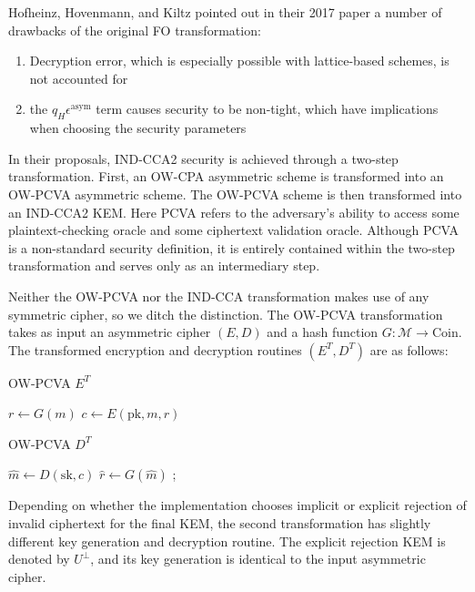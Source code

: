 \documentclass{article}
\begin{document}
Hofheinz, Hovenmann, and Kiltz pointed out in their 2017 paper a number of drawbacks of the original FO transformation:

\begin{enumerate}
    \item Decryption error, which is especially possible with lattice-based schemes, is not accounted for
    \item the $q_H\epsilon^\text{asym}$ term causes security to be non-tight, which have implications when choosing the security parameters
\end{enumerate}

In their proposals, IND-CCA2 security is achieved through a two-step transformation. First, an OW-CPA asymmetric scheme is transformed into an OW-PCVA asymmetric scheme. The OW-PCVA scheme is then transformed into an IND-CCA2 KEM. Here PCVA refers to the adversary's ability to access some plaintext-checking oracle and some ciphertext validation oracle. Although PCVA is a non-standard security definition, it is entirely contained within the two-step transformation and serves only as an intermediary step.

Neither the OW-PCVA nor the IND-CCA transformation makes use of any symmetric cipher, so we ditch the distinction. The OW-PCVA transformation takes as input an asymmetric cipher $(E, D)$ and a hash function $G: \mathcal{M} \rightarrow \text{Coin}$. The transformed encryption and decryption routines $(E^T, D^T)$ are as follows:

\begin{multicols}{2}
    \begin{algorithm}[H]
        \SetAlgoLined
        \caption{OW-PCVA $E^T$}
        $r \leftarrow G(m)$\;
        $c \leftarrow E(\text{pk}, m, r)$\;
        \;
    \end{algorithm}

    \columnbreak

    \begin{algorithm}[H]
        \SetAlgoLined
        \caption{OW-PCVA $D^T$}
        $\hat{m} \leftarrow D(\text{sk}, c)$\;
        $\hat{r} \leftarrow G(\hat{m})$\;
        ;
    \end{algorithm}
\end{multicols}

Depending on whether the implementation chooses implicit or explicit rejection of invalid ciphertext for the final KEM, the second transformation has slightly different key generation and decryption routine. The explicit rejection KEM is denoted by $U^\bot$, and its key generation is identical to the input asymmetric cipher.
\end{document}
